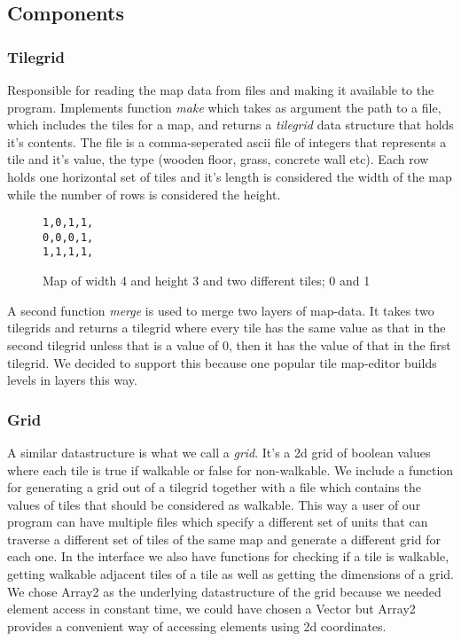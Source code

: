 \documentclass[12pt, a4paper]{article}
\begin{document}
\subsection{Components}
\subsubsection{Tilegrid}

Responsible for reading the map data from files and making it available to the program. Implements function \textit{make} which takes as argument the path to a file, which includes the tiles for a map, and returns a \textit{tilegrid} data structure that holds it's contents. The file is a comma-seperated ascii file of integers that represents a tile and it's value, the type (wooden floor, grass, concrete wall etc). Each row holds one horizontal set of tiles and it's length is considered the width of the map while the number of rows is considered the height.
\begin{figure}[htbp]
\centering
\texttt{1,0,1,1,\\
0,0,0,1,\\
1,1,1,1,\\
}
\caption{Map of width 4 and height 3 and two different tiles; 0 and 1}
\end{figure}

A second function \textit{merge} is used to merge two layers of map-data. It takes two tilegrids and returns a tilegrid where every tile has the same value as that in the second tilegrid unless that is a value of 0, then it has the value of that in the first tilegrid. We decided to support this because one popular tile map-editor\cite{mapeditor} builds levels in layers this way.

\subsubsection{Grid}

A similar datastructure is what we call a \textit{grid}. It's a 2d grid of boolean values where each tile is true if walkable or false for non-walkable. We include a function for generating a grid out of a tilegrid together with a file which contains the values of tiles that should be considered as walkable. This way a user of our program can have multiple files which specify a different set of units that can traverse a different set of tiles of the same map and generate a different grid for each one. In the interface we also have functions for checking if a tile is walkable, getting walkable adjacent tiles of a tile as well as getting the dimensions of a grid. We chose Array2 as the underlying datastructure of the grid because we needed element access in constant time, we could have chosen a Vector but Array2 provides a convenient way of accessing elements using 2d coordinates.
\end{document}
